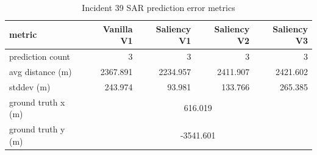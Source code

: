 \begin{table}[ht]
\centering
\caption{Incident 39 SAR prediction error metrics}
\label{tab:sar-incident-39}
\begin{tabular}{lrrrr}
\hline
metric & Vanilla V1 & Saliency V1 & Saliency V2 & Saliency V3 \\
\hline
prediction count & 3 & 3 & 3 & 3 \\
avg distance (m) & 2367.891 & 2234.957 & 2411.907 & 2421.602 \\
stddev (m) & 243.974 & 93.981 & 133.766 & 265.385 \\
ground truth x (m) & \multicolumn{4}{c}{616.019} \\
ground truth y (m) & \multicolumn{4}{c}{-3541.601} \\
\hline
\end{tabular}
\end{table}
